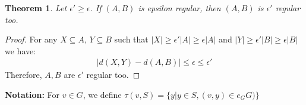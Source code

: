 \documentclass{article}
\newtheorem{theorem}{Theorem}[]
\begin{document}
\begin{theorem}
	Let $\epsilon'\geq \epsilon$. If $(A,B)$ is epsilon regular, then $(A,B)$ is $\epsilon'$ regular too.
\end{theorem}
\begin{proof}
	For any  $X\subseteq A$, $Y\subseteq B$ such that $|X|\geq \epsilon'|A|\geq  \epsilon |A|$ and $|Y|\geq  \epsilon'|B|\geq  \epsilon|B|$ we have:
	\begin{align}|d(X,Y)-d(A,B)|\leq  \epsilon\leq \epsilon'\end{align}
	Therefore, $A,B$ are $\epsilon'$ regular too. 
\end{proof}


\noindent\textbf{Notation: }For $v\in G$, we define $\tau(v,S)=\{y|y\in S, (v,y)\in e_GG)\}$
\end{document}
